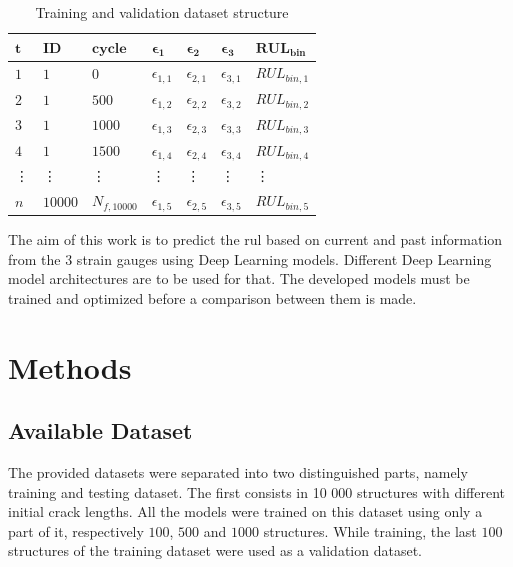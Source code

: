 \documentclass[conference]{IEEEtran}
\begin{document}
\begin{table}[htp]
	\centering
	\caption{Training and validation dataset structure}
	\label{tab:sliding_window_approach}
	\begin{tabular}{lllllll}
		$ \boldsymbol{t} $ & $ \boldsymbol{ID} $ & $ \boldsymbol{cycle} $ & $ \boldsymbol{\epsilon_1} $     & $ \boldsymbol{\epsilon_2} $     & $ \boldsymbol{\epsilon_3} $     & $ \boldsymbol{RUL_{bin}} $   \\
		\hline
		$ 1 $ & $ 1 $  & $ 0 $     & $ \epsilon_{1,1} $ & $ \epsilon_{2,1} $ &  $ \epsilon_{3,1} $ &  $ RUL_{bin,1} $ \\
		$ 2 $ & $ 1 $  & $ 500 $   & $ \epsilon_{1,2} $ & $ \epsilon_{2,2} $ & $ \epsilon_{3,2} $ & $ RUL_{bin,2} $ \\
		$ 3 $ & $ 1 $  & $ 1000 $  & $ \epsilon_{1,3} $ & $ \epsilon_{2,3} $ & $ \epsilon_{3,3} $ & $ RUL_{bin,3} $ \\
		$ 4 $ & $ 1 $  & $ 1500 $  & $ \epsilon_{1,4} $ & $ \epsilon_{2,4} $ & $ \epsilon_{3,4} $ & $ RUL_{bin,4} $ \\
		\vdots & \vdots & \vdots & \vdots & \vdots &\vdots & \vdots \\
		$ n $ & $ 10000 $  & $ N_{f,10000} $  & $ \epsilon_{1,5} $ & $ \epsilon_{2,5} $ & $ \epsilon_{3,5} $ & $ RUL_{bin,5} $
	\end{tabular}
\end{table}

The aim of this work is to predict the \gls{rul} based on current and past information from the 3 strain gauges using Deep Learning models. Different Deep Learning model architectures are to be used for that. The developed models must be trained and optimized before a comparison between them is made.

\section{Methods}
\label{sec:methods}

\noindent
\subsection{Available Dataset}

The provided datasets were separated into two distinguished parts, namely training and testing dataset. The first consists in 10 000 structures with different initial crack lengths. All the models were trained on this dataset using only a part of it, respectively $ 100 $, $ 500 $ and $ 1000 $ structures. While training, the last $ 100 $ structures of the training dataset were used as a validation dataset.
\end{document}
